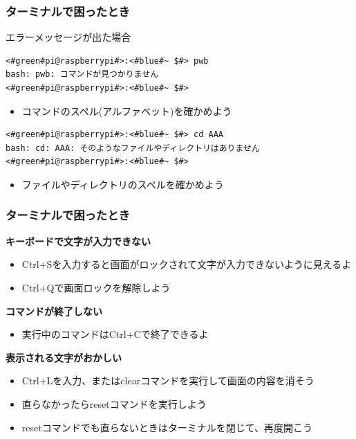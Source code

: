 \documentclass[slide03.tex]{subfiles}
\begin{document}
\begin{frame}[fragile]
    \frametitle{ターミナルで困ったとき}
    エラーメッセージが出た場合
    \begin{lstlisting}
<#green#pi@raspberrypi#>:<#blue#~ $#> pwb
bash: pwb: コマンドが見つかりません
<#green#pi@raspberrypi#>:<#blue#~ $#>
        \end{lstlisting}
    \begin{itemize}
        \item コマンドのスペル(アルファベット)を確かめよう
    \end{itemize}
    \begin{lstlisting}
<#green#pi@raspberrypi#>:<#blue#~ $#> cd AAA
bash: cd: AAA: そのようなファイルやディレクトリはありません
<#green#pi@raspberrypi#>:<#blue#~ $#>
        \end{lstlisting}
    \begin{itemize}
        \item ファイルやディレクトリのスペルを確かめよう
    \end{itemize}
\end{frame}

\begin{frame}
    \frametitle{ターミナルで困ったとき}
    {\bf キーボードで文字が入力できない}
    \begin{itemize}
        \item Ctrl+Sを入力すると画面がロックされて文字が入力できないように見えるよ
        \item Ctrl+Qで画面ロックを解除しよう
    \end{itemize}
    {\bf コマンドが終了しない}
    \begin{itemize}
        \item 実行中のコマンドはCtrl+Cで終了できるよ
    \end{itemize}
    {\bf 表示される文字がおかしい}
    \begin{itemize}
        \item Ctrl+Lを入力、またはclearコマンドを実行して画面の内容を消そう
        \item 直らなかったらresetコマンドを実行しよう
        \item resetコマンドでも直らないときはターミナルを閉じて、再度開こう
    \end{itemize}
\end{frame}
\end{document}
